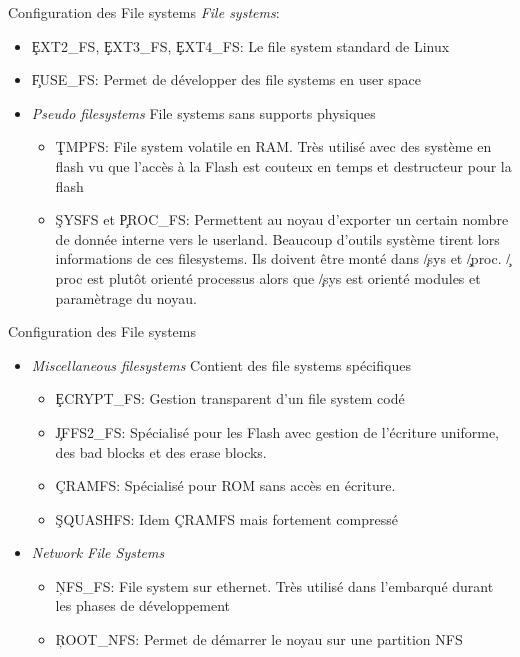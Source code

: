 \begin{frame}[fragile=singleslide]{Configuration des File systems}
  \emph{File systems}:
  \begin{itemize}
  \item  \c{EXT2_FS},   \c{EXT3_FS},  \c{EXT4_FS}: Le   file  system
    standard de Linux
  \item \c{FUSE_FS}:  Permet de développer  des file systems  en user
    space
  \item   \emph{Pseudo  filesystems}   File  systems   sans  supports
    physiques
    \begin{itemize} 
    \item \c{TMPFS}: File system  volatile en RAM.  Très utilisé avec
      des système en flash vu que  l'accès à la Flash est couteux en
      temps et destructeur pour la flash
    \item \c{SYSFS} et \c{PROC_FS}: Permettent au noyau d'exporter un
      certain nombre  de donnée  interne vers le  userland. Beaucoup
      d'outils système tirent  lors informations de ces filesystems.
      Ils doivent  être monté dans \c{/sys}  et \c{/proc}. \c{/proc}
      est plutôt  orienté processus  alors que \c{/sys}  est orienté
      modules et paramètrage du noyau.
    \end{itemize} 
  \end{itemize}
\end{frame}

\begin{frame}[fragile=singleslide]{Configuration des File systems}
  \begin{itemize}
\item \emph{Miscellaneous  filesystems} Contient des  file systems
    spécifiques
    \begin{itemize} 
    \item \c{ECRYPT_FS}: Gestion transparent d'un file system codé
    \item  \c{JFFS2_FS}: Spécialisé  pour les  Flash avec  gestion de
      l'écriture uniforme, des bad blocks et des erase blocks.
    \item \c{CRAMFS}: Spécialisé pour ROM sans accès en écriture. 
    \item  \c{SQUASHFS}: Idem \c{CRAMFS} mais fortement compressé
    \end{itemize} 
  \item \emph{Network File Systems}
    \begin{itemize}
    \item \c{NFS_FS}:  File system  sur ethernet.  Très  utilisé dans
      l'embarqué durant les phases de développement
    \item \c{ROOT_NFS}: Permet de démarrer le noyau sur une partition
      NFS
    \end{itemize} 
  \end{itemize} 
\end{frame}

